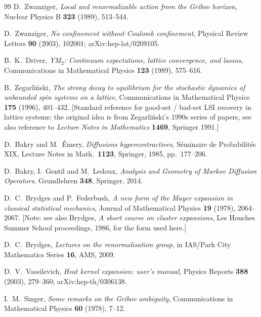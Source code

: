 \documentclass[11pt,a4paper]{amsart}
\theoremstyle{definition}
\begin{document}
\begin{thebibliography}{99}
D.~Zwanziger,
\emph{Local and renormalizable action from the Gribov horizon},
Nuclear Physics B \textbf{323} (1989), 513--544.

D.~Zwanziger,
\emph{No confinement without Coulomb confinement},
Physical Review Letters \textbf{90} (2003), 102001;
arXiv:hep-lat/0209105.

B.~K.~Driver,
\emph{YM$_2$: Continuum expectations, lattice convergence, and lassos},
Communications in Mathematical Physics \textbf{123} (1989), 575--616.

B.~Zegarli\'nski,
\emph{The strong decay to equilibrium for the stochastic dynamics of
unbounded spin systems on a lattice},
Communications in Mathematical Physics \textbf{175} (1996), 401--432.
[Standard reference for good-set / bad-set LSI recovery in lattice
systems; the original idea is from Zegarli\'nski's 1990s series of
papers, see also reference to \emph{Lecture Notes in Mathematics}
\textbf{1469}, Springer 1991.]

D.~Bakry and M.~\'Emery,
\emph{Diffusions hypercontractives},
S\'eminaire de Probabilit\'es XIX, Lecture Notes in Math.\ \textbf{1123},
Springer, 1985, pp.~177--206.

D.~Bakry, I.~Gentil and M.~Ledoux,
\emph{Analysis and Geometry of Markov Diffusion Operators},
Grundlehren \textbf{348}, Springer, 2014.

D.~C.~Brydges and P.~Federbush,
\emph{A new form of the Mayer expansion in classical statistical mechanics},
Journal of Mathematical Physics \textbf{19} (1978), 2064--2067.
[Note: see also Brydges, \emph{A short course on cluster expansions},
Les Houches Summer School proceedings, 1986, for the form used here.]

D.~C.~Brydges,
\emph{Lectures on the renormalisation group},
in IAS/Park City Mathematics Series \textbf{16}, AMS, 2009.

D.~V.~Vassilevich,
\emph{Heat kernel expansion: user's manual},
Physics Reports \textbf{388} (2003), 279--360; arXiv:hep-th/0306138.

I.~M.~Singer,
\emph{Some remarks on the Gribov ambiguity},
Communications in Mathematical Physics \textbf{60} (1978), 7--12.

\end{thebibliography}
\end{document}
